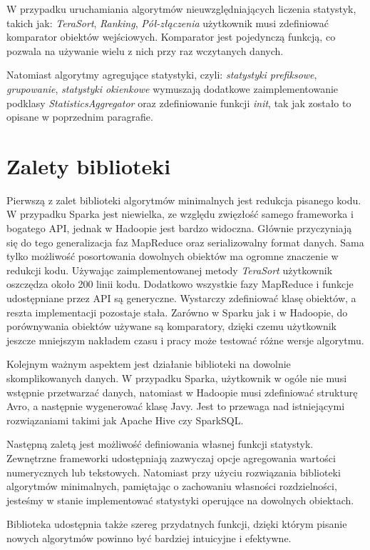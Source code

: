 \documentclass{pracamgr}
\begin{document}
W przypadku uruchamiania algorytmów nieuwzględniających liczenia statystyk, takich jak: \textit{TeraSort}, \textit{Ranking}, \textit{Pół-złączenia} użytkownik musi zdefiniować komparator obiektów wejściowych. Komparator jest pojedynczą funkcją, co pozwala na używanie wielu z nich przy raz wczytanych danych.

Natomiast algorytmy agregujące statystyki, czyli: \textit{statystyki prefiksowe}, \textit{grupowanie}, \textit{statystyki okienkowe} wymuszają dodatkowe zaimplementowanie podklasy \textit{StatisticsAggregator} oraz zdefiniowanie funkcji \textit{init}, tak jak zostało to opisane w poprzednim paragrafie.

\chapter{Zalety biblioteki}

Pierwszą z zalet biblioteki algorytmów minimalnych jest redukcja pisanego kodu. W przypadku Sparka jest niewielka, ze względu zwięzłość samego frameworka i bogatego API, jednak w Hadoopie jest bardzo widoczna. Głównie przyczyniają się do tego generalizacja faz MapReduce oraz serializowalny format danych. Sama tylko możliwość posortowania dowolnych obiektów ma ogromne znaczenie w redukcji kodu. Używając zaimplementowanej metody \textit{TeraSort} użytkownik oszczędza około 200 linii kodu. Dodatkowo wszystkie fazy MapReduce i funkcje udostępniane przez API są generyczne. Wystarczy zdefiniować klasę obiektów, a reszta implementacji pozostaje stała. Zarówno w Sparku jak i w Hadoopie, do porównywania obiektów używane są komparatory, dzięki czemu użytkownik jeszcze mniejszym nakładem czasu i pracy może testować różne wersje algorytmu.

Kolejnym ważnym aspektem jest działanie biblioteki na dowolnie skomplikowanych danych. W przypadku Sparka, użytkownik w ogóle nie musi wstępnie przetwarzać danych, natomiast w Hadoopie musi zdefiniować strukturę Avro, a następnie wygenerować klasę Javy. Jest to przewaga nad istniejącymi rozwiązaniami takimi jak Apache Hive czy SparkSQL.

Następną zaletą jest możliwość definiowania własnej funkcji statystyk. Zewnętrzne frameworki udostępniają zazwyczaj opcje agregowania wartości numerycznych lub tekstowych. Natomiast przy użyciu rozwiązania biblioteki algorytmów minimalnych, pamiętając o zachowaniu własności rozdzielności, jesteśmy w stanie implementować statystyki operujące na dowolnych obiektach.

Biblioteka udostępnia także szereg przydatnych funkcji, dzięki którym pisanie nowych algorytmów powinno być bardziej intuicyjne i efektywne.
\end{document}
